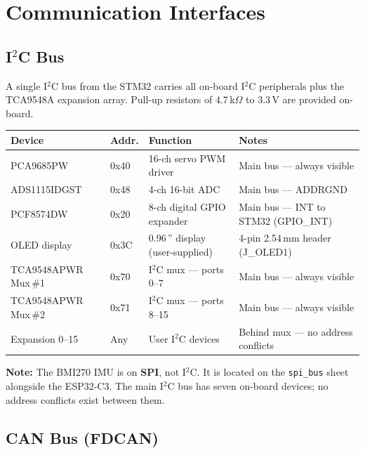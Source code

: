 \documentclass[11pt,a4paper]{article}
\begin{document}
\section{Communication Interfaces}

\subsection{\texorpdfstring{I$^2$C}{I2C} Bus}

A single I$^2$C bus from the STM32 carries all on-board I$^2$C peripherals plus the TCA9548A expansion array. Pull-up resistors of 4.7\,k$\Omega$ to 3.3\,V are provided on-board.

\begin{longtable}{p{3cm} p{1.5cm} p{4cm} p{6cm}}
  \toprule
  \rowcolor{headergray}\color{white}\textbf{Device} &
  \color{white}\textbf{Addr.} &
  \color{white}\textbf{Function} &
  \color{white}\textbf{Notes} \\
  \midrule\endhead
  PCA9685PW         & 0x40 & 16-ch servo PWM driver   & Main bus --- always visible \\
  ADS1115IDGST      & 0x48 & 4-ch 16-bit ADC          & Main bus --- ADDR\textrightarrow{}GND \\
  PCF8574DW         & 0x20 & 8-ch digital GPIO expander & Main bus --- INT to STM32 (GPIO\_INT) \\
  OLED display      & 0x3C & 0.96\,'' display (user-supplied) & 4-pin 2.54\,mm header (J\_OLED1) \\
  TCA9548APWR Mux\,\#1 & 0x70 & I$^2$C mux --- ports 0--7 & Main bus --- always visible \\
  TCA9548APWR Mux\,\#2 & 0x71 & I$^2$C mux --- ports 8--15 & Main bus --- always visible \\
  Expansion 0--15   & Any  & User I$^2$C devices       & Behind mux --- no address conflicts \\
  \bottomrule
\end{longtable}

\begin{infobox}
\textbf{Note:} The BMI270 IMU is on \textbf{SPI}, not I$^2$C. It is located on the \texttt{spi\_bus} sheet alongside the ESP32-C3. The main I$^2$C bus has seven on-board devices; no address conflicts exist between them.
\end{infobox}

\subsection{CAN Bus (FDCAN)}
\end{document}
